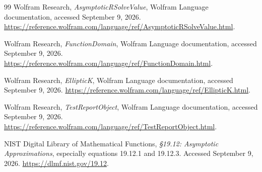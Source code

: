 \begin{thebibliography}{99}
 Wolfram Research, \emph{AsymptoticRSolveValue}, Wolfram Language documentation, accessed September 9, 2026. \url{https://reference.wolfram.com/language/ref/AsymptoticRSolveValue.html}.

 Wolfram Research, \emph{FunctionDomain}, Wolfram Language documentation, accessed September 9, 2026. \url{https://reference.wolfram.com/language/ref/FunctionDomain.html}.

 Wolfram Research, \emph{EllipticK}, Wolfram Language documentation, accessed September 9, 2026. \url{https://reference.wolfram.com/language/ref/EllipticK.html}.

 Wolfram Research, \emph{TestReportObject}, Wolfram Language documentation, accessed September 9, 2026. \url{https://reference.wolfram.com/language/ref/TestReportObject.html}.

 NIST Digital Library of Mathematical Functions, \emph{\S19.12: Asymptotic Approximations}, especially equations 19.12.1 and 19.12.3. Accessed September 9, 2026. \url{https://dlmf.nist.gov/19.12}.
\end{thebibliography}
